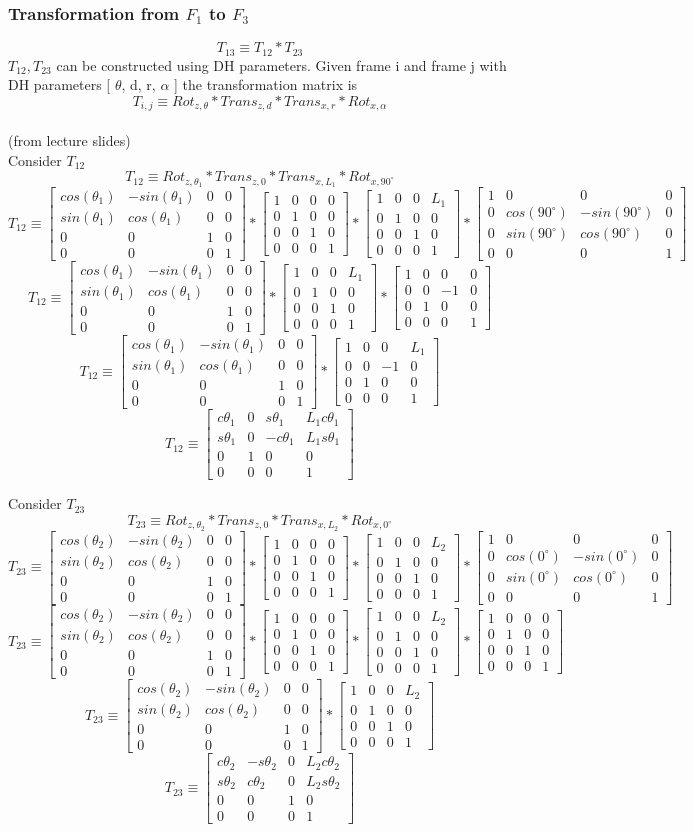 \documentclass[12pt]{article}
\newcommand{\fromlectures}{{\\ \color{blue} \hspace*{\fill}(from lecture slides)} \\}
\newcommand{\rx}[1]{\begin{bmatrix} 1 & 0 & 0 & 0 \\ 0 & cos(#1) & -sin(#1) & 0 \\ 0 & sin(#1) & cos(#1) & 0 \\ 0 & 0 & 0 & 1 \end{bmatrix}}
\newcommand{\rz}[1]{\begin{bmatrix} cos(#1) & -sin(#1) & 0 & 0 \\ sin(#1) & cos(#1) & 0 & 0 \\ 0 & 0 & 1 & 0 \\ 0 & 0 & 0 & 1 \end{bmatrix}}
\newcommand{\iden}{\begin{bmatrix} 1 & 0 & 0 & 0 \\ 0 & 1 & 0 & 0 \\ 0 & 0 & 1 & 0 \\ 0 & 0 & 0 & 1 \end{bmatrix}}
\newcommand{\trans}[3]{\begin{bmatrix} 1 & 0 & 0 & #1 \\ 0 & 1 & 0 & #2 \\ 0 & 0 & 1 & #3 \\ 0 & 0 & 0 & 1 \end{bmatrix}}
\begin{document}
\subsubsection*{Transformation from $F_1$ to $F_3$}
\[
  T_{13} \equiv T_{12} * T_{23}
\]
$T_{12}, T_{23}$ can be constructed using DH parameters.
Given frame i and frame j with DH parameters [ $\theta$, d, r, $\alpha$ ] the transformation matrix is
\[
  T_{i,j} \equiv Rot_{z,\theta} * Trans_{z, d} * Trans_{x, r} * Rot_{x, \alpha}
\]
\fromlectures
Consider $T_{12}$
\[
  T_{12} \equiv Rot_{z,\theta_1} * Trans_{z, 0} * Trans_{x, L_1} * Rot_{x, 90^{\circ}}
\]
\[
  T_{12} \equiv \rz{\theta_1} * \trans{0}{0}{0} * \trans{L_1}{0}{0} * \rx{90^{\circ}}
\]
\[
  T_{12} \equiv \rz{\theta_1} * \trans{L_1}{0}{0}
    * \begin{bmatrix} 1 & 0 & 0 & 0 \\ 0 & 0 & -1 & 0 \\ 0 & 1 & 0 & 0 \\ 0 & 0 & 0 & 1 \end{bmatrix}
\]
\[
  T_{12} \equiv \rz{\theta_1}
  * \begin{bmatrix} 1 & 0 & 0 & L_1 \\ 0 & 0 & -1 & 0 \\ 0 & 1 & 0 & 0 \\ 0 & 0 & 0 & 1 \end{bmatrix}
\]
\[
  T_{12} \equiv
  \begin{bmatrix} c\theta_1 & 0 & s\theta_1 & L_1c\theta_1 \\ s\theta_1 & 0 & -c\theta_1 & L_1s\theta_1 \\ 0 & 1 & 0 & 0 \\ 0 & 0 & 0 & 1 \end{bmatrix}
\]

Consider $T_{23}$
\[
  T_{23} \equiv Rot_{z,\theta_2} * Trans_{z, 0} * Trans_{x, L_2} * Rot_{x, 0^{\circ}}
\]
\[
  T_{23} \equiv \rz{\theta_2} * \trans{0}{0}{0} * \trans{L_2}{0}{0} * \rx{0^{\circ}}
\]
\[
  T_{23} \equiv \rz{\theta_2} * \trans{0}{0}{0} * \trans{L_2}{0}{0} * \iden
\]
\[
  T_{23} \equiv \rz{\theta_2} * \trans{L_2}{0}{0}
\]
\[
  T_{23} \equiv
  \begin{bmatrix} c\theta_2 & -s\theta_2 & 0 & L_2c\theta_2 \\ s\theta_2 & c\theta_2 & 0 & L_2s\theta_2 \\ 0 & 0 & 1 & 0 \\ 0 & 0 & 0 & 1 \end{bmatrix}
\]
\end{document}
